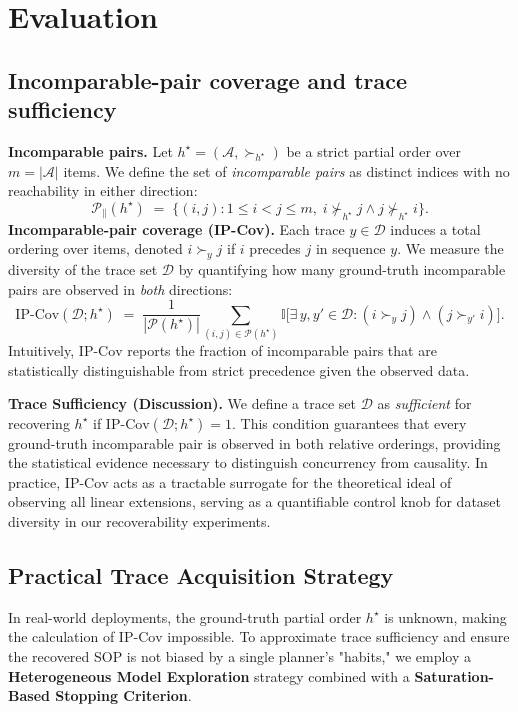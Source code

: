 \documentclass{article}
\theoremstyle{plain}
\theoremstyle{definition}
\theoremstyle{remark}
\begin{document}
\section{Evaluation}
\subsection{Incomparable-pair coverage and trace sufficiency}
\label{app:cp_cov_def}

\noindent \textbf{Incomparable pairs.}
Let $h^\star=(\mathcal{A}, \succ_{h^\star})$ be a strict partial order over $m=|\mathcal{A}|$ items. We define the set of \emph{incomparable pairs} as distinct indices with no reachability in either direction:
\[
\mathcal{P}_{\parallel}(h^\star)
\;=\;
\bigl\{(i,j) : 1\le i < j \le m, \; i \not\succ_{h^\star} j \land j \not\succ_{h^\star} i \bigr\}.
\]
\noindent \textbf{Incomparable-pair coverage (IP-Cov).}
Each trace $y \in \mathcal{D}$ induces a total ordering over items, denoted $i \succ_y j$ if $i$ precedes $j$ in sequence $y$. We measure the diversity of the trace set $\mathcal{D}$ by quantifying how many ground-truth incomparable pairs are observed in \emph{both} directions:
\[
\mathrm{IP\text{-}Cov}(\mathcal{D}; h^\star)
\;=\;
\frac{1}{|\mathcal{P}(h^\star)|}
\sum_{(i,j)\in\mathcal{P}(h^\star)}
\mathbb{I}\Big[\exists\, y, y' \in \mathcal{D} : (i \succ_{y} j) \land (j \succ_{y'} i) \Big].
\]
Intuitively, $\mathrm{IP\text{-}Cov}$ reports the fraction of incomparable pairs that are statistically distinguishable from strict precedence given the observed data.

\noindent \textbf{Trace Sufficiency (Discussion).}
We define a trace set $\mathcal{D}$ as \emph{sufficient} for recovering $h^\star$ if $\mathrm{IP\text{-}Cov}(\mathcal{D};h^\star)=1$. This condition guarantees that every ground-truth incomparable pair is observed in both relative orderings, providing the statistical evidence necessary to distinguish concurrency from causality. In practice, $\mathrm{IP\text{-}Cov}$ acts as a tractable surrogate for the theoretical ideal of observing all linear extensions, serving as a quantifiable control knob for dataset diversity in our recoverability experiments.

\subsection{Practical Trace Acquisition Strategy}
\label{app:trace_acquisition}

In real-world deployments, the ground-truth partial order $h^\star$ is unknown, making the calculation of $\mathrm{IP\text{-}Cov}$ impossible. To approximate trace sufficiency and ensure the recovered SOP is not biased by a single planner's "habits," we employ a \textbf{Heterogeneous Model Exploration} strategy combined with a \textbf{Saturation-Based Stopping Criterion}.
\end{document}
